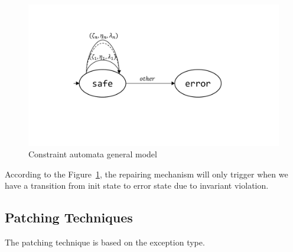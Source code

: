 \begin{figure}[t]
\centering
\includegraphics[scale=.25]{images/automata.pdf}
\caption{Constraint automata general model}
\label{fig:automata}
\end{figure}

According to the Figure~\ref{fig:automata}, the repairing mechanism will only
trigger when we have a transition from 
init state to error state due to invariant violation.

\subsection{Patching Techniques}
\label{subsec:patchCA}

The patching technique is based on the exception type. 
